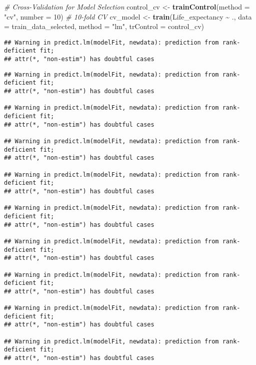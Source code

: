 \documentclass[
]{article}
\newenvironment{Shaded}{\begin{snugshade}}{\end{snugshade}}
\newcommand{\AttributeTok}[1]{\textcolor[rgb]{0.13,0.29,0.53}{#1}}
\newcommand{\CommentTok}[1]{\textcolor[rgb]{0.56,0.35,0.01}{\textit{#1}}}
\newcommand{\DecValTok}[1]{\textcolor[rgb]{0.00,0.00,0.81}{#1}}
\newcommand{\FunctionTok}[1]{\textcolor[rgb]{0.13,0.29,0.53}{\textbf{#1}}}
\newcommand{\NormalTok}[1]{#1}
\newcommand{\OtherTok}[1]{\textcolor[rgb]{0.56,0.35,0.01}{#1}}
\newcommand{\SpecialCharTok}[1]{\textcolor[rgb]{0.81,0.36,0.00}{\textbf{#1}}}
\newcommand{\StringTok}[1]{\textcolor[rgb]{0.31,0.60,0.02}{#1}}
\begin{document}
\begin{Shaded}
\begin{Highlighting}[]
\CommentTok{\# Cross{-}Validation for Model Selection}
\NormalTok{control\_cv }\OtherTok{\textless{}{-}} \FunctionTok{trainControl}\NormalTok{(}\AttributeTok{method =} \StringTok{"cv"}\NormalTok{, }\AttributeTok{number =} \DecValTok{10}\NormalTok{)  }\CommentTok{\# 10{-}fold CV}
\NormalTok{cv\_model }\OtherTok{\textless{}{-}} \FunctionTok{train}\NormalTok{(Life\_expectancy }\SpecialCharTok{\textasciitilde{}}\NormalTok{ ., }\AttributeTok{data =}\NormalTok{ train\_data\_selected, }\AttributeTok{method =} \StringTok{"lm"}\NormalTok{, }\AttributeTok{trControl =}\NormalTok{ control\_cv)}
\end{Highlighting}
\end{Shaded}

\begin{verbatim}
## Warning in predict.lm(modelFit, newdata): prediction from rank-deficient fit;
## attr(*, "non-estim") has doubtful cases
\end{verbatim}

\begin{verbatim}
## Warning in predict.lm(modelFit, newdata): prediction from rank-deficient fit;
## attr(*, "non-estim") has doubtful cases

## Warning in predict.lm(modelFit, newdata): prediction from rank-deficient fit;
## attr(*, "non-estim") has doubtful cases

## Warning in predict.lm(modelFit, newdata): prediction from rank-deficient fit;
## attr(*, "non-estim") has doubtful cases

## Warning in predict.lm(modelFit, newdata): prediction from rank-deficient fit;
## attr(*, "non-estim") has doubtful cases

## Warning in predict.lm(modelFit, newdata): prediction from rank-deficient fit;
## attr(*, "non-estim") has doubtful cases

## Warning in predict.lm(modelFit, newdata): prediction from rank-deficient fit;
## attr(*, "non-estim") has doubtful cases

## Warning in predict.lm(modelFit, newdata): prediction from rank-deficient fit;
## attr(*, "non-estim") has doubtful cases

## Warning in predict.lm(modelFit, newdata): prediction from rank-deficient fit;
## attr(*, "non-estim") has doubtful cases

## Warning in predict.lm(modelFit, newdata): prediction from rank-deficient fit;
## attr(*, "non-estim") has doubtful cases
\end{verbatim}
\end{document}
